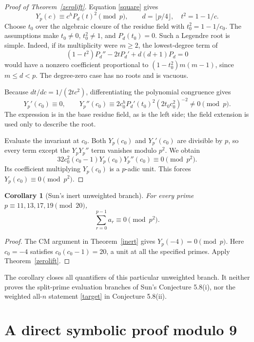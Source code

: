 \documentclass[11pt,a4paper]{article}
\newtheorem{corollary}[theorem]{Corollary}
\theoremstyle{remark}\newtheorem{remark}[theorem]{Remark}
\begin{document}
\begin{proof}[Proof of Theorem~\ref{zerolift}]
Equation \eqref{square} gives
\[
 Y_p(c)\equiv c^hP_d(t)^2\pmod p,\qquad
 d=\lfloor p/4\rfloor,\quad t^2=1-1/c.
\]
Choose \(t_0\) over the algebraic closure of the residue field with
\(t_0^2=1-1/c_0\).
The assumptions make \(t_0\ne0\), \(t_0^2\ne1\), and \(P_d(t_0)=0\).
Such a Legendre root is simple. Indeed, if its multiplicity were
\(m\ge2\), the lowest-degree term of
\[
        (1-t^2)P_d''-2tP_d'+d(d+1)P_d=0
\]
would have a nonzero coefficient proportional to
\((1-t_0^2)m(m-1)\), since \(m\le d<p\).
The degree-zero case has no roots and is vacuous.

Because \(dt/dc=1/(2tc^2)\), differentiating the polynomial congruence
gives
\[
 Y_p'(c_0)\equiv0,\qquad
 Y_p''(c_0)\equiv
 2c_0^hP_d'(t_0)^2(2t_0c_0^2)^{-2}\ne0\pmod p.
\]
The expression is in the base residue field, as is the left side;
the field extension is used only to describe the root.

Evaluate the invariant at \(c_0\). Both \(Y_p(c_0)\) and
\(Y_p'(c_0)\) are divisible by \(p\), so every term except the
\(Y_pY_p''\) term vanishes modulo \(p^2\). We obtain
\[
       32c_0^2(c_0-1)Y_p(c_0)Y_p''(c_0)\equiv0\pmod {p^2}.
\]
Its coefficient multiplying \(Y_p(c_0)\) is a \(p\)-adic unit.
This forces \(Y_p(c_0)\equiv0\pmod {p^2}\).
\end{proof}

\begin{corollary}[Sun's inert unweighted branch]\label{unweighted}
For every prime \(p\equiv11,13,17,19\pmod {20}\),
\[
                 \sum_{r=0}^{p-1}a_r\equiv0\pmod {p^2}.
\]
\end{corollary}
\begin{proof}
The CM argument in Theorem~\ref{inert} gives \(Y_p(-4)=0\pmod p\).
Here \(c_0=-4\) satisfies \(c_0(c_0-1)=20\), a unit at all the
specified primes. Apply Theorem~\ref{zerolift}.
\end{proof}

The corollary closes all quantifiers of this particular unweighted
branch. It neither proves the split-prime evaluation branches of
Sun's Conjecture 5.8(i), nor the weighted all-\(n\) statement
\eqref{target} in Conjecture 5.8(ii).


\section{A direct symbolic proof modulo 9}
\end{document}
